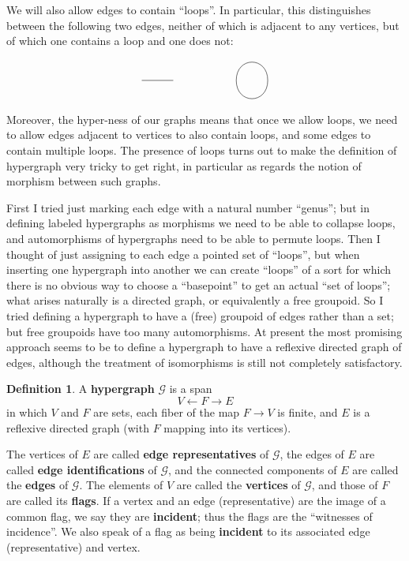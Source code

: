 \documentclass{article}
\theoremstyle{definition}
\newtheorem{defn}[thm]{Definition}
\theoremstyle{remark}
\def\G{\mathcal{G}}
\let\ot\leftarrow
\begin{document}
We will also allow edges to contain ``loops''.
In particular, this distinguishes between the following two edges, neither of which is adjacent to any vertices, but of which one contains a loop and one does not:
\[
\begin{tikzpicture}
  \draw (0,0) -- (1,0);
  \draw (3,0) to[out=90,in=90,looseness=2] (4,0) to[out=-90,in=-90,looseness=2] (3,0);
\end{tikzpicture}
\]
Moreover, the hyper-ness of our graphs means that once we allow loops, we need to allow edges adjacent to vertices to also contain loops, and some edges to contain multiple loops.
The presence of loops turns out to make the definition of hypergraph very tricky to get right, in particular as regards the notion of morphism between such graphs.

First I tried just marking each edge with a natural number ``genus''; but in defining labeled hypergraphs as morphisms we need to be able to collapse loops, and automorphisms of hypergraphs need to be able to permute loops.
Then I thought of just assigning to each edge a pointed set of ``loops'', but when inserting one hypergraph into another we can create ``loops'' of a sort for which there is no obvious way to choose a ``basepoint'' to get an actual ``set of loops''; what arises naturally is a directed graph, or equivalently a free groupoid.
So I tried defining a hypergraph to have a (free) groupoid of edges rather than a set; but free groupoids have too many automorphisms.
At present the most promising approach seems to be to define a hypergraph to have a reflexive directed graph of edges, although the treatment of isomorphisms is still not completely satisfactory.

\begin{defn}
  A \textbf{hypergraph} $\G$ is a span
  \[ V \ot F \to E \]
  in which $V$ and $F$ are sets, each fiber of the map $F\to V$ is finite, and $E$ is a reflexive directed graph (with $F$ mapping into its vertices).

  The vertices of $E$ are called \textbf{edge representatives} of $\G$, the edges of $E$ are called \textbf{edge identifications} of $\G$, and the connected components of $E$ are called the \textbf{edges} of $\G$.
  The elements of $V$ are called the \textbf{vertices} of $\G$, and those of $F$ are called its \textbf{flags}.
  If a vertex and an edge (representative) are the image of a common flag, we say they are \textbf{incident}; thus the flags are the ``witnesses of incidence''.
  We also speak of a flag as being \textbf{incident} to its associated edge (representative) and vertex.
\end{defn}
\end{document}
